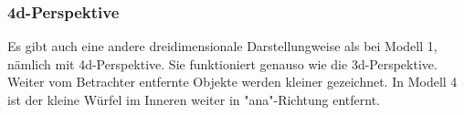 \subsubsection*{4d-Perspektive}
Es gibt auch eine andere dreidimensionale Darstellungweise als bei Modell 1, nämlich mit 4d-Perspektive. Sie funktioniert genauso wie die 3d-Perspektive. Weiter vom Betrachter entfernte Objekte werden kleiner gezeichnet. In Modell 4 ist der kleine Würfel im Inneren weiter in "ana"-Richtung entfernt. %


